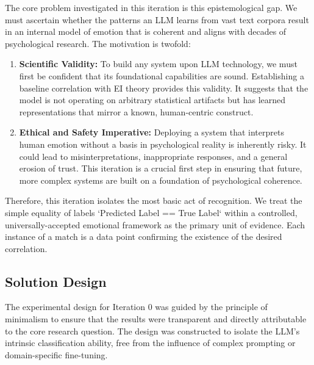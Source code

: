The core problem investigated in this iteration is this epistemological gap. We must ascertain whether the patterns an LLM learns from vast text corpora result in an internal model of emotion that is coherent and aligns with decades of psychological research. The motivation is twofold:
\begin{enumerate}
    \item \textbf{Scientific Validity:} To build any system upon LLM technology, we must first be confident that its foundational capabilities are sound. Establishing a baseline correlation with EI theory provides this validity. It suggests that the model is not operating on arbitrary statistical artifacts but has learned representations that mirror a known, human-centric construct.
    \item \textbf{Ethical and Safety Imperative:} Deploying a system that interprets human emotion without a basis in psychological reality is inherently risky. It could lead to misinterpretations, inappropriate responses, and a general erosion of trust. This iteration is a crucial first step in ensuring that future, more complex systems are built on a foundation of psychological coherence.
\end{enumerate}
Therefore, this iteration isolates the most basic act of recognition. We treat the simple equality of labels `Predicted Label == True Label` within a controlled, universally-accepted emotional framework as the primary unit of evidence. Each instance of a match is a data point confirming the existence of the desired correlation.

\subsection{Solution Design}
The experimental design for Iteration 0 was guided by the principle of minimalism to ensure that the results were transparent and directly attributable to the core research question. The design was constructed to isolate the LLM's intrinsic classification ability, free from the influence of complex prompting or domain-specific fine-tuning.

